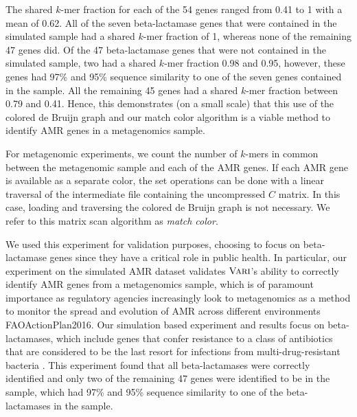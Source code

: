 \documentclass{article}
\def\ours{\mbox{\rm {\sc Vari}}}
\def \citep #1{\cite{#1}}
\begin{document}
The shared $k$-mer fraction for each of the 54 genes ranged from 0.41 to 1 with a mean of 0.62.  All of the seven beta-lactamase genes that were contained in the simulated sample had a shared $k$-mer fraction of 1, whereas none of the remaining 47 genes did.  Of the 47 beta-lactamase genes that were not contained in the simulated sample, two had a shared $k$-mer fraction 0.98 and 0.95, however, these genes had 97\% and 95\% sequence similarity to one of the seven genes contained in the sample.  All the remaining 45 genes had a shared $k$-mer fraction between 0.79 and 0.41.  Hence, this demonstrates (on a small scale) that this use of the colored de Bruijn graph and our match color algorithm is a viable method to identify AMR genes in a metagenomics sample. 


For metagenomic experiments, we count the number of $k$-mers in common between the metagenomic sample and each of the AMR genes.  If each AMR gene is available as a separate color, the set operations can be done with a linear traversal of the intermediate file containing the uncompressed $C$ matrix.  In this case, loading and traversing the colored de Bruijn graph is not necessary.  We refer to this matrix scan algorithm as {\it match color}. 

We used this experiment for validation purposes, choosing to focus on beta-lactamase genes since they have a critical role in public health.  In particular, our experiment on the simulated AMR dataset validates $\ours$'s ability to correctly identify AMR genes from a metagenomics sample, which is of paramount importance as regulatory agencies increasingly look to metagenomics as a method to monitor the spread and evolution of AMR across different environments {FAOActionPlan2016}.  Our simulation based experiment and results focus on beta-lactamases, which include genes that confer resistance to a class of antibiotics that are considered to be the last resort for infections from multi-drug-resistant bacteria \citep{mckenna,carbapenem_review}.  This experiment found that all beta-lactamases were correctly identified and only two of the remaining 47 genes were identified to be in the sample, which had 97\% and 95\% sequence similarity to one of the beta-lactamases in the sample.
\end{document}
